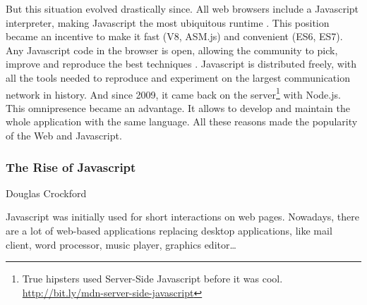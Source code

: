 But this situation evolved drastically since.
All web browsers include a Javascript interpreter, making Javascript the most ubiquitous runtime \cite{Flanagan2006}.
This position became an incentive to make it fast (V8, ASM.js) and convenient (ES6, ES7).
Any Javascript code in the browser is open, allowing the community to pick, improve and reproduce the best techniques .
Javascript is distributed freely, with all the tools needed to reproduce and experiment on the largest communication network in history.
And since 2009, it came back on the server\footnote{True hipsters used Server-Side Javascript before it was cool. \url{http://bit.ly/mdn-server-side-javascript}} with Node.js.
This omnipresence became an advantage.
It allows to develop and maintain the whole application with the same language.
All these reasons made the popularity of the Web and Javascript.


\subsubsection{The Rise of Javascript}

%
{Douglas Crockford}

Javascript was initially used for short interactions on web pages.
Nowadays, there are a lot of web-based applications replacing desktop applications, like mail client, word processor, music player, graphics editor\ldots

